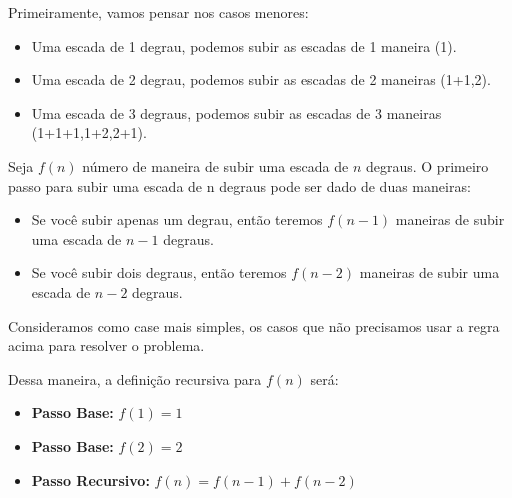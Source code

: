Primeiramente, vamos pensar nos casos menores:

\begin{itemize}
    \item Uma escada de 1 degrau, podemos subir as escadas de 1 maneira (1).
    \item Uma escada de 2 degrau, podemos subir as escadas de 2 maneiras (1+1,2).
    \item Uma escada de 3 degraus, podemos subir as escadas de 3 maneiras (1+1+1,1+2,2+1).
\end{itemize}


Seja $f(n)$ número de maneira de subir uma escada de $n$ degraus. O primeiro passo para subir uma escada de n degraus pode ser dado de duas maneiras:

\begin{itemize}
    \item Se você subir apenas um degrau, então teremos $f(n-1)$ maneiras de subir uma escada de $n-1$ degraus.
    \item Se você subir dois degraus, então teremos $f(n-2)$ maneiras de subir uma escada de $n-2$ degraus.
\end{itemize}

Consideramos como case mais simples, os casos que não precisamos usar a regra acima para resolver o problema.


Dessa maneira, a definição recursiva para $f(n)$ será:

\begin{itemize}
    \item \textbf{Passo Base:} $f(1) = 1$
    \item \textbf{Passo Base:} $f(2) = 2$
    
    \item \textbf{Passo Recursivo:} $f(n) = f(n-1) + f(n-2)$
\end{itemize}






